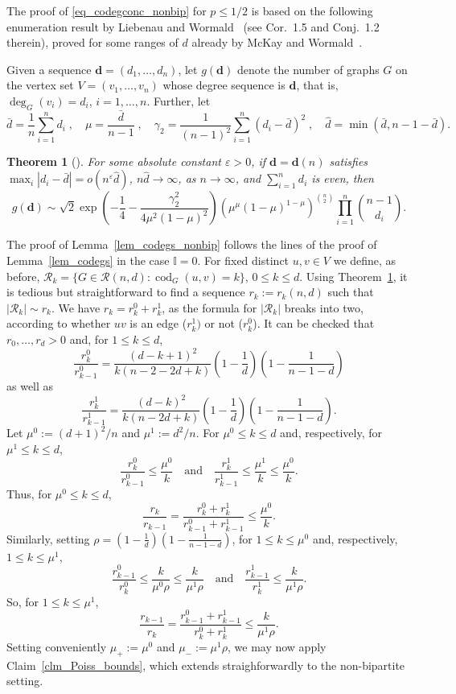 \documentclass[12pt,reqno]{amsart}
\newcommand{\rc}{{\mathcal{R}}}
\newcommand{\eps} {\varepsilon}
\newcommand{\I} {\mathbb I}
\newcommand{\cod}{\operatorname{cod}}
\newtheorem{theorem}{Theorem}
\theoremstyle{definition}
\begin{document}
The proof of \eqref{eq_codegconc_nonbip} for $p \le 1/2$ is based on the following enumeration  result by Liebenau and Wormald~\cite{LW2017} (see Cor.~1.5 and Conj.~1.2 therein), proved for some ranges of $d$ already  by McKay and Wormald~\cite{MW90,MW91}.

 Given a sequence $\mathbf{d}=(d_1,\dots,d_n)$, let $g(\mathbf{d})$ denote the number of graphs $G$ on the vertex set $V=(v_1,\dots,v_n)$ whose degree sequence is $\mathbf{d}$, that is, $\deg_G(v_i)=d_i$, $i=1,\dots,n$. Further, let
\[
  \bar d=\frac1n\sum_{i=1}^nd_i\;,\quad\mu=\frac{\bar d}{n-1}\;,\quad \gamma_2=\frac1{(n-1)^2}\sum_{i=1}^n(d_i-\bar d)^2\;,\quad\hat d=\min(\bar d,n-1-\bar d).
\]

\begin{theorem}[\cite{LW2017}]
  \label{thm_enum_nonbip}
	For some absolute constant $\eps > 0$, if $\mathbf{d}=\mathbf{d}(n)$ satisfies $\max_i|d_i-\bar d|=o(n^\eps\hat d)$, $n\hat d\to\infty$, as $n\to\infty$, and $\sum_{i=1}^nd_i$ is even, then
\[
  g(\mathbf{d})\sim\sqrt2\exp\left(-\frac14-\frac{\gamma_2^2}{4\mu^2(1-\mu)^2}\right)\left(\mu^\mu(1-\mu)^{1-\mu}\right)^{\binom n2}\prod_{i=1}^n\binom{n-1}{d_i}.
\]
\end{theorem}

The proof of Lemma~\ref{lem_codegs_nonbip} follows the lines of the proof of Lemma~\ref{lem_codegs} in the case $\I=0$. For fixed distinct $u,v\in V$ we define, as before, $\rc_k = \{ G \in \rc(n,d) : \cod_G(u,v) = k \}$, $0\le k\le d$. Using Theorem~\ref{thm_enum_nonbip}, it is tedious but straightforward to find a sequence $r_k:=r_k(n,d)$ such that $|\rc_k|\sim r_k$. We have $r_k = r_k^0 + r_k^1$, as the formula for $|\rc_k|$ breaks into two, according to whether $uv$ is an edge ($r_k^1)$ or not ($r_k^0$). It can be checked that $r_0, \dots, r_d > 0$ and, for $1\le k\le d$,
\[
  \frac{r_k^0}{r_{k-1}^0}=\frac{(d-k+1)^2}{k(n-2-2d+k)}\left(1-\frac1d\right)\left(1-\frac1{n-1-d}\right)
\]
 as well as
 \[
   \frac{r_k^1}{r_{k-1}^1}=\frac{(d-k)^2}{k(n-2d+k)}\left(1-\frac1d\right)\left(1-\frac1{n-1-d}\right).
 \]
Let
$\mu^0 := (d+1)^2/n$ and $\mu^1 := d^2/n$. For $\mu^0\le k\le d$ and, respectively, for $\mu^1\le k\le d$,
\[
  \frac{r_k^0}{r_{k-1}^0}\le\frac{\mu^0}k\quad\mbox{and}\quad\frac{r_k^1}{r_{k-1}^1}\le\frac{\mu^1}k\le\frac{\mu^0}k.
\]
Thus, for $\mu^0\le k\le d$,
\[
\frac{r_k}{r_{k-1}}=\frac{r_k^0+r_k^1}{r_{k-1}^0+r_{k-1}^1}\le\frac{\mu^0}k.
\]
Similarly, setting $\rho=\left(1-\frac1d\right)\left(1-\frac1{n-1-d}\right)$, for $1\le k\le\mu^0$ and, respectively, $1\le k\le\mu^1$,
\[
  \frac{r_{k-1}^0}{r_{k}^0}\le\frac k{\mu^0\rho}\le\frac k{\mu^1\rho}\quad\mbox{and}\quad\frac{r_{k-1}^1}{r_{k}^1}\le\frac k{\mu^1\rho}.
\]
So, for $1\le k\le\mu^1$,
\[
\frac{r_{k-1}}{r_k}=\frac{r_{k-1}^0+r_{k-1}^1}{r_k^0+r_k^1}\le\frac k{\mu^1\rho}.
\]
Setting conveniently $\mu_+:=\mu^0$ and $\mu_-:=\mu^1\rho$, we may now apply Claim~\ref{clm_Poiss_bounds}, which extends straighforwardly to the non-bipartite setting.
\end{document}

